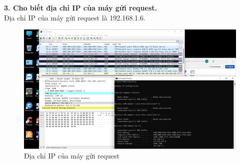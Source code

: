 \textbf{3.	Cho biết địa chỉ IP của máy gửi request.}\\
Địa chỉ IP của máy gửi request là 192.168.1.6.
\begin{figure}[H]
\begin{center}
\includegraphics[scale=1]{../figures/p3/p3_hostip}
\end{center}
\caption{Địa chỉ IP của máy gửi request}
\end{figure}

